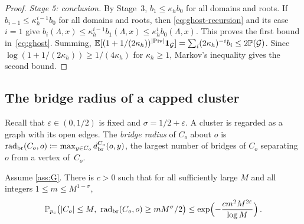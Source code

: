 \begin{proof}
\emph{Stage 5: conclusion.} By Stage~3, $b_1\le\kappa_hb_0$ for all domains and roots. If $b_{i-1}\le\kappa_h^{i-1}b_0$ for all domains and roots, then
\eqref{eq:ghost-recursion} and its case $i=1$ give $b_i(\Lambda,x)\le\kappa_h^{i-1}b_1(\Lambda,x)
\le\kappa_h^ib_0(\Lambda,x)$. This proves the first bound in~\eqref{eq:ghost}. Summing,
$\mathbb E[(1+1/(2\kappa_h))^{\lvert\operatorname{Piv}\rvert}\mathbf{1}_{\mathcal G}]=\sum_i(2\kappa_h)^{-i}b_i\le2\mathbb P(\mathcal G)$.
Since $\log(1+1/(2\kappa_h))\ge1/(4\kappa_h)$ for $\kappa_h\ge1$, Markov's inequality gives the
second bound.
\end{proof}

\subsection{The bridge radius of a capped cluster}\label{sec:bridge-radius}

Recall that $\varepsilon\in(0,1/2)$ is fixed and $\sigma=1/2+\varepsilon$. A cluster is regarded as a
graph with its open edges. The \emph{bridge radius} of $C_o$ about $o$ is
$\operatorname{rad}_{\mathrm{br}}(C_o,o)\coloneqq\max_{y\in C_o}d_{\mathrm{br}}^{C_o}(o,y)$, the largest number of bridges of $C_o$ separating
$o$ from a vertex of~$C_o$.

\begin{lemma}\label{lem:bridge-radius}
Assume \cref{ass:G}. There is $c>0$ such that for all sufficiently large $M$ and all integers
$1\le m\le M^{1-\sigma}$,
\begin{equation}\label{eq:bridge-radius}
  \mathbb P_{p_c}\bigl(\lvert C_o\rvert\le M,\ \operatorname{rad}_{\mathrm{br}}(C_o,o)\ge mM^\sigma/2\bigr)
  \le\exp\Bigl(-\frac{cm^2M^{2\varepsilon}}{\log M}\Bigr)\,.
\end{equation}
\end{lemma}

